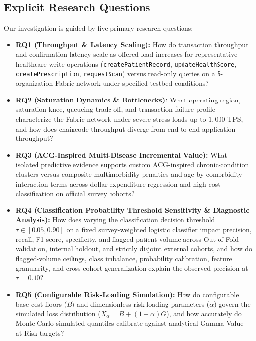 \documentclass[runningheads]{llncs}
\begin{document}
\subsection{Explicit Research Questions}
Our investigation is guided by five primary research questions:
\begin{itemize}
    \item \textbf{RQ1 (Throughput \& Latency Scaling):} How do transaction throughput and confirmation latency scale as offered load increases for representative healthcare write operations (\texttt{createPatientRecord}, \texttt{updateHealthScore}, \texttt{createPrescription}, \texttt{requestScan}) versus read-only queries on a 5-organization Fabric network under specified testbed conditions?
    \item \textbf{RQ2 (Saturation Dynamics \& Bottlenecks):} What operating region, saturation knee, queueing trade-off, and transaction failure profile characterize the Fabric network under severe stress loads up to $1,000$ TPS, and how does chaincode throughput diverge from end-to-end application throughput?
    \item \textbf{RQ3 (ACG-Inspired Multi-Disease Incremental Value):} What isolated predictive evidence supports custom ACG-inspired chronic-condition clusters versus composite multimorbidity penalties and age-by-comorbidity interaction terms across dollar expenditure regression and high-cost classification on official survey cohorts?
    \item \textbf{RQ4 (Classification Probability Threshold Sensitivity \& Diagnostic Analysis):} How does varying the classification decision threshold $\tau \in [0.05, 0.90]$ on a fixed survey-weighted logistic classifier impact precision, recall, F1-score, specificity, and flagged patient volume across Out-of-Fold validation, internal holdout, and strictly disjoint external cohorts, and how do flagged-volume ceilings, class imbalance, probability calibration, feature granularity, and cross-cohort generalization explain the observed precision at $\tau = 0.10$?
    \item \textbf{RQ5 (Configurable Risk-Loading Simulation):} How do configurable base-cost floors ($B$) and dimensionless risk-loading parameters ($\alpha$) govern the simulated loss distribution ($X_\alpha = B + (1+\alpha)G$), and how accurately do Monte Carlo simulated quantiles calibrate against analytical Gamma Value-at-Risk targets?
\end{itemize}

\end{document}
